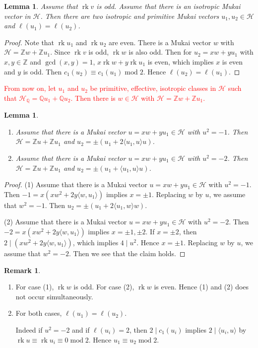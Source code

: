 \documentclass[leqno,11pt]{amsart}
\def\Q{\ensuremath{\mathbb{Q}}}
\def\Z{\ensuremath{\mathbb{Z}}}
\def\mod{\mathop{\mathrm{mod}}\nolimits}
\def\rk{\mathop{\mathrm{rk}}}
\newtheorem{Lem}[Thm]{Lemma}
\theoremstyle{definition}
\newtheorem{Rem}[Thm]{Remark}
\def\Q{\ensuremath{\mathbb{Q}}}
\def\Z{\ensuremath{\mathbb{Z}}}
\def\HH{\ensuremath{\mathcal H}}
\begin{document}
\begin{Lem}
Assume that $\rk v$ is odd.
Assume that there is an isotropic Mukai vector in $\HH$.
Then there are two isotropic and primitive Mukai vectors
$u_1,u_2 \in \HH$ and $\ell(u_1)=\ell(u_2)$.
\end{Lem}

\begin{proof}
Note that $\rk u_1$ and $\rk u_2$ are even.
There is a Mukai vector $w$ with $\HH=\Z w+\Z u_1$.
Since $\rk v$ is odd, $\rk w$ is also odd. 
Then for $u_2=x w+y u_1$ with $x,y \in \Z$ and $\gcd(x,y)=1$,
$x \rk w+y \rk u_1$ is even, which implies $x$ is even and $y$ is odd.
Then $c_1(u_2) \equiv  c_1(u_1) \mod 2$.
Hence $\ell(u_2)=\ell(u_1)$.
\end{proof}


\textcolor{red}
{From now on, let $u_1$ and $u_2$ be primitive, effective, isotropic classes in $\HH$
such that $\HH_{\Q}=\Q u_1+\Q u_2$.
Then there is $w \in \HH$ with $\HH=\Z w+\Z u_1$. }
\begin{Lem}\label{Lem:negative stable classes}
\begin{enumerate}
\item[(1)]
Assume that there is a Mukai vector $u=x w+yu_1 \in \HH$ with $u^2=-1$. 
Then
$\HH=\Z u+\Z u_1$ and
$u_2=\pm(u_1+2 \langle u_1,u \rangle u)$.
\item[(2)]
Assume that there is a Mukai vector $u=x w+yu_1 \in \HH$ with $u^2=-2$.
Then $\HH=\Z u+\Z u_1$ and
$u_2=\pm(u_1+ \langle u_1,u \rangle u)$.
\end{enumerate}
\end{Lem}

\begin{proof}
(1)
Assume that there is a Mukai vector $u=x w+yu_1 \in \HH$ with $u^2=-1$.
Then
$-1=x(x w^2+2y \langle w,u_1 \rangle)$ implies
$x=\pm 1$.  Replacing $w$ by $u$, we assume that $w^2=-1$.
Then $u_2=\pm(u_1+2 \langle u_1,w \rangle w)$.


(2) 
Assume that there is a Mukai vector $u=x w+yu_1 \in \HH$ with $u^2=-2$.
Then 
$-2=x(x w^2+2y \langle w,u_1 \rangle)$ implies
$x=\pm 1,\pm 2$.  
If $x=\pm 2$, then $2 \mid (x w^2+2y \langle w,u_1 \rangle)$,
which implies $4 \mid u^2$.
Hence $x=\pm 1$.
Replacing $w$ by $u$, we assume that $w^2=-2$.
Then we see that the claim holds.
\end{proof}

\begin{Rem}\label{Rem:negative stable classes}
\begin{enumerate}
\item
For case (1), $\rk w$ is odd. For case (2), $\rk w$ is even.
Hence (1) and (2) does not occur simultaneously.
\item
For both cases, $\ell(u_1)=\ell(u_2)$.

Indeed if $u^2=-2$ and 
if $\ell(u_i)=2$, then $2 \mid c_1(u_i)$ implies $2 \mid \langle u_i,u \rangle$
by
$\rk u \equiv \rk u_i \equiv 0 \mod 2$.
Hence $u_1 \equiv u_2 \mod 2$.
\end{enumerate}
\end{Rem}
\end{document}
